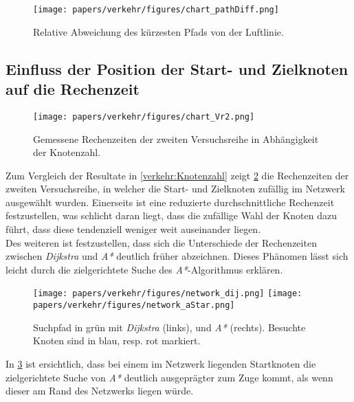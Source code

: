 \begin{figure}
\centering
\texttt{[image: papers/verkehr/figures/chart\_pathDiff.png]}

\caption{Relative Abweichung des kürzesten Pfads von der Luftlinie.}
\label{verkehr:pathDifference}
\end{figure}


\subsection{Einfluss der Position der Start- und Zielknoten auf die Rechenzeit}

\begin{figure}
\centering
\texttt{[image: papers/verkehr/figures/chart\_Vr2.png]}\\
\caption{Gemessene Rechenzeiten der zweiten Versuchsreihe in Abhängigkeit der Knotenzahl.}
\label{verkehr:Vr2}
\end{figure}

Zum Vergleich der Resultate in \ref{verkehr:Knotenzahl} zeigt \ref{verkehr:Vr2} die Rechenzeiten der zweiten Versuchsreihe, in welcher die Start- und Zielknoten zufällig im Netzwerk ausgewählt wurden. Einerseits ist eine reduzierte durchschnittliche Rechenzeit festzustellen, was schlicht daran liegt, dass die zufällige Wahl der Knoten dazu führt, dass diese tendenziell weniger weit auseinander liegen.\\
Des weiteren ist festzustellen, dass sich die Unterschiede der Rechenzeiten zwischen  \emph{Dijkstra} und \emph{A*} deutlich früher abzeichnen. Dieses Phänomen lässt sich leicht durch die zielgerichtete Suche des \emph{A*}-Algorithmus erklären.

\begin{figure}
\centering
\texttt{[image: papers/verkehr/figures/network\_dij.png]}\qquad
\texttt{[image: papers/verkehr/figures/network\_aStar.png]}
\caption{Suchpfad in grün mit \emph{Dijkstra} (links), und \emph{A*} (rechts). Besuchte Knoten sind in blau, resp. rot markiert.}
\label{verkehr:Comparison}
\end{figure}

In \ref{verkehr:Comparison} ist ersichtlich, dass bei einem im Netzwerk liegenden Startknoten die zielgerichtete Suche von \emph{A*} deutlich ausgeprägter zum Zuge kommt, als wenn dieser am Rand des Netzwerks liegen würde.
